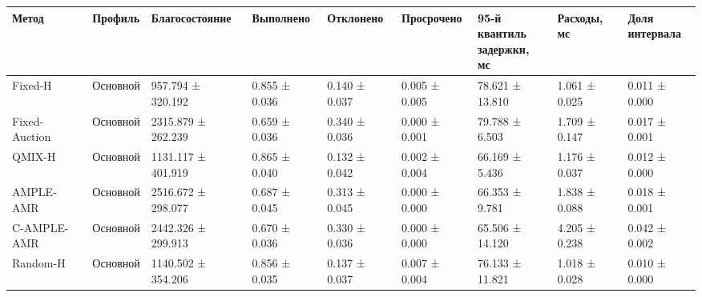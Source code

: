 \begin{tabular}{lllllllll}
\toprule
 Метод & Профиль & Благосостояние & Выполнено & Отклонено & Просрочено & \shortstack{95-й квантиль\\задержки, мс} & Расходы, мс & \shortstack{Доля\\интервала} \\
\midrule
 Fixed-H & Основной & 957.794 ± 320.192 & 0.855 ± 0.036 & 0.140 ± 0.037 & 0.005 ± 0.005 & 78.621 ± 13.810 & 1.061 ± 0.025 & 0.011 ± 0.000 \\
 Fixed-Auction & Основной & 2315.879 ± 262.239 & 0.659 ± 0.036 & 0.340 ± 0.036 & 0.000 ± 0.001 & 79.788 ± 6.503 & 1.709 ± 0.147 & 0.017 ± 0.001 \\
 QMIX-H & Основной & 1131.117 ± 401.919 & 0.865 ± 0.040 & 0.132 ± 0.042 & 0.002 ± 0.004 & 66.169 ± 5.436 & 1.176 ± 0.037 & 0.012 ± 0.000 \\
 AMPLE-AMR & Основной & 2516.672 ± 298.077 & 0.687 ± 0.045 & 0.313 ± 0.045 & 0.000 ± 0.000 & 66.353 ± 9.781 & 1.838 ± 0.088 & 0.018 ± 0.001 \\
 C-AMPLE-AMR & Основной & 2442.326 ± 299.913 & 0.670 ± 0.036 & 0.330 ± 0.036 & 0.000 ± 0.000 & 65.506 ± 14.120 & 4.205 ± 0.238 & 0.042 ± 0.002 \\
 Random-H & Основной & 1140.502 ± 354.206 & 0.856 ± 0.035 & 0.137 ± 0.037 & 0.007 ± 0.004 & 76.133 ± 11.821 & 1.018 ± 0.028 & 0.010 ± 0.000 \\
\bottomrule
\end{tabular}
